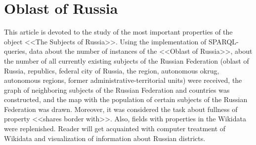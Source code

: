 \chapter{Oblast of Russia}
\label{ch:oblast-of-Russia}
This article is devoted to the study of the most important properties of 
the object <<The Subjects of Russia>>. Using the implementation of SPARQL-queries, 
data about the number of instances of the <<Oblast of Russia>>, about the number of 
all currently existing subjects of the Russian Federation (oblast of Russia, republics, 
federal city of Russia, the region, autonomous okrug, autonomous regions, former 
administrative-territorial units) were received, the graph of neighboring subjects 
of the Russian Federation and countries was constructed, and the map with the population 
of certain subjects of the Russian Federation was drawn. Moreover, it was considered the 
task about fullness of property <<shares border with>>. Also, fields with properties in the 
Wikidata were replenished. Reader will get acquainted with computer treatment of Wikidata 
and visualization of information about Russian districts.

